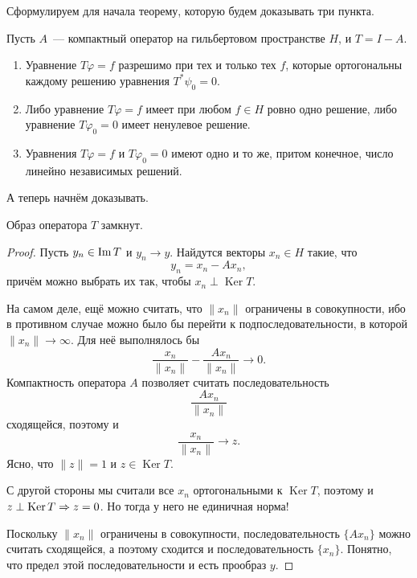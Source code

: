 \documentclass{notes}
\DeclareMathOperator{\Ker}{Ker}
\begin{document}
	Сформулируем для начала теорему, которую будем доказывать три пункта.

	\begin{thm} \label{thm:fredh}
		Пусть $A$~--- компактный оператор на гильбертовом пространстве $H$, и $T = I - A$.
		\begin{enumerate}
			\item Уравнение $T\varphi = f$ разрешимо при тех и только тех $f$, которые ортогональны каждому решению уравнения $T^{*} \psi_0 = 0$.
			\item Либо уравнение $T \varphi = f$ имеет при любом $f \in H$ ровно одно решение, либо уравнение $T \varphi_0 = 0$ имеет ненулевое решение.
			\item Уравнения $T \varphi = f$ и $T \varphi_0 = 0$ имеют одно и то же, притом конечное, число линейно независимых решений.
		\end{enumerate}
	\end{thm}
		
	А теперь начнём доказывать.

	\begin{lm} \label{lm:fredh-closed-image}
		Образ оператора $T$ замкнут.
		\begin{proof}
			Пусть $y_n \in \operatorname{Im} T$ и $y_n \to y$. Найдутся векторы $x_n \in H$ такие, что
			\[
				y_n = x_n - Ax_n,
			\]
			причём можно выбрать их так, чтобы $x_n \perp \Ker T$.

			На самом деле, ещё можно считать, что $\|x_n\|$ ограничены в совокупности, ибо в противном случае можно было бы перейти к подпоследовательности, в которой $\|x_n\| \to \infty$. Для неё выполнялось бы
			\[
				\dfrac{x_n}{\|x_n\|} - \dfrac{Ax_n}{\|x_n\|} \to 0.
			\]
			Компактность оператора $A$ позволяет считать последовательность 
			\[
				\dfrac{Ax_n}{\|x_n\|}
			\]
			сходящейся, поэтому и
			\[
				\dfrac{x_n}{\|x_n\|} \to z.
			\]
			Ясно, что $\|z\| = 1$ и $z \in \Ker T$.

			С другой стороны мы считали все $x_n$ ортогональными к $\Ker T$, поэтому и $z \perp \Ker T \so z = 0$. Но тогда у него не единичная норма!

			Поскольку $\|x_n\|$ ограничены в совокупности, последовательность $\{Ax_n\}$ можно считать сходящейся, а поэтому сходится и последовательность $\{x_n\}$. Понятно, что предел этой последовательности и есть прообраз $y$.
 		\end{proof}
	\end{lm}
\end{document}
